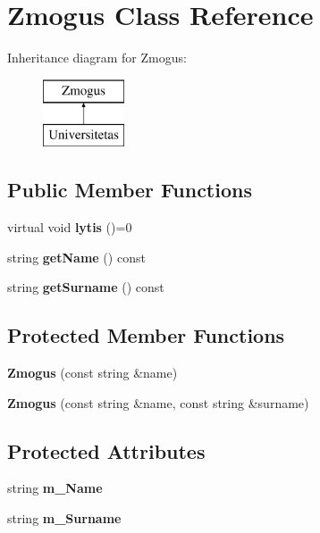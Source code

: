 \hypertarget{class_zmogus}{}\section{Zmogus Class Reference}
\label{class_zmogus}
Inheritance diagram for Zmogus\+:\begin{figure}[H]
\begin{center}
\leavevmode
\includegraphics[height=2.000000cm]{class_zmogus}
\end{center}
\end{figure}
\subsection*{Public Member Functions}
\begin{DoxyCompactItemize}
\item 
\mbox{\label{class_zmogus_a01b04e61e073e3590326d462ad42247e}} 
virtual void {\bfseries lytis} ()=0
\item 
\mbox{\label{class_zmogus_ad09081a9463b42b80eba2ea745877095}} 
string {\bfseries get\+Name} () const
\item 
\mbox{\label{class_zmogus_a4f6dc26fb4b6a63bff6b7c4021c196c6}} 
string {\bfseries get\+Surname} () const
\end{DoxyCompactItemize}
\subsection*{Protected Member Functions}
\begin{DoxyCompactItemize}
\item 
\mbox{\label{class_zmogus_a9ed94ed8814d263b7e240a4b85802343}} 
{\bfseries Zmogus} (const string \&name)
\item 
\mbox{\label{class_zmogus_a745bee3bf027c67d6592838d8ebf5002}} 
{\bfseries Zmogus} (const string \&name, const string \&surname)
\end{DoxyCompactItemize}
\subsection*{Protected Attributes}
\begin{DoxyCompactItemize}
\item 
\mbox{\label{class_zmogus_a67f11569fe576ca64d271259b7600370}} 
string {\bfseries m\+\_\+\+Name}
\item 
\mbox{\label{class_zmogus_ab8900783ffde6f36c1d98e4d2f626a01}} 
string {\bfseries m\+\_\+\+Surname}
\end{DoxyCompactItemize}


